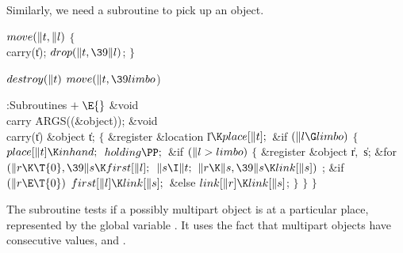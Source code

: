 Similarly, we need a subroutine to pick up an object.

\Y\B\4\D$\\{move}(\|t,\|l)$ \5
${}\{{}$\5
\1\\{carry}(\|t);\5
${}\\{drop}(\|t,\39\|l){}$;\5
${}\}{}$\2\par
\B\4\D$\\{destroy}(\|t)$ \5
$\\{move}(\|t,\39\\{limbo}{}$)\par
\Y\B\4:Subroutines\X${}\mathrel+\E{}$\6
\&{void} \\{carry}\,\,\.{ARGS}((\&{object}));\7
\&{void} \\{carry}(\|t)\1\1\6
\&{object} \|t;\2\2\6
${}\{{}$\5
\1\&{register} \&{location} \|l${}\K\\{place}[\|t];{}$\7
\&{if} ${}(\|l\G\\{limbo}){}$\5
${}\{{}$\1\6
${}\\{place}[\|t]\K\\{inhand};{}$\6
${}\\{holding}\PP;{}$\6
\&{if} ${}(\|l>\\{limbo}){}$\5
${}\{{}$\1\6
\&{register} \&{object} \|r${},{}$ \|s;\7
\&{for} ${}(\|r\K\T{0},\39\|s\K\\{first}[\|l];{}$ ${}\|s\I\|t;{}$ ${}\|r\K\|s,%
\39\|s\K\\{link}[\|s]){}$\1\5
;\2\6
\&{if} ${}(\|r\E\T{0}){}$\1\5
${}\\{first}[\|l]\K\\{link}[\|s];{}$\2\6
\&{else}\1\5
${}\\{link}[\|r]\K\\{link}[\|s]{}$;\2\6
\4${}\}{}$\2\6
\4${}\}{}$\2\6
\4${}\}{}$\2\par
\fi

The  subroutine tests if a possibly
multipart object is
at a particular place, represented by the global variable .
It uses the fact that multipart objects
have consecutive values, and .

